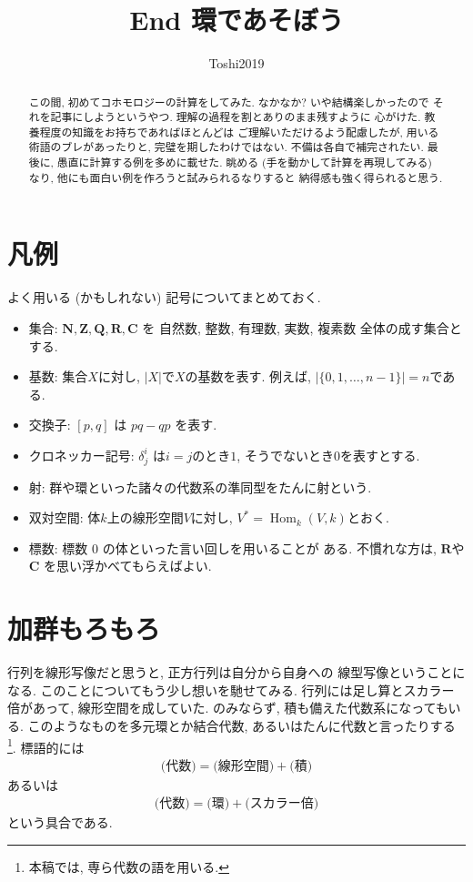 \documentclass[11pt, a4paper, dvipdfmx]{jsarticle}
\title{End 環であそぼう}
\author{Toshi2019}
\date{}
\theoremstyle{definition}
\newcommand{\nn}{\mathbf{N}}
\newcommand{\zz}{\mathbf{Z}}
\newcommand{\qq}{\mathbf{Q}}
\newcommand{\rr}{\mathbf{R}}
\newcommand{\cc}{\mathbf{C}}
\newcommand{\Hom}{\mathop{\mathrm{Hom}}\nolimits}
\newcommand{\dl}{\delta} %
\numberwithin{equation}{section}
\begin{document}
\maketitle

\begin{abstract}
    この間, 初めてコホモロジーの計算をしてみた. 
    なかなか? いや結構楽しかったので
    それを記事にしようというやつ. 
    理解の過程を割とありのまま残すように
    心がけた. 
    教養程度の知識をお持ちであればほとんどは
    ご理解いただけるよう配慮したが, 
    用いる術語のブレがあったりと, 
    完璧を期したわけではない. 
    不備は各自で補完されたい. 
    最後に, 愚直に計算する例を多めに載せた. 
    眺める (手を動かして計算を再現してみる) 
    なり, 他にも面白い例を作ろうと試みられるなりすると
    納得感も強く得られると思う. 
\end{abstract}

\section{凡例}

よく用いる (かもしれない) 記号についてまとめておく. 

\begin{itemize}
    \item 集合: $\nn, \zz, \qq, \rr, \cc$ を
    自然数, 整数, 有理数, 実数, 複素数
    全体の成す集合とする. 
    \item 基数: 集合$X$に対し, $|X|$で$X$の基数を表す. 例えば, 
    $|\{0,1,\ldots,n-1\}| = n$である. 
    \item 交換子: $[p,q]$ は $pq - qp$ を表す. 
    \item クロネッカー記号: 
    $\dl_j^i$ は$i=j$のとき$1$, そうでないとき$0$を表すとする. 
    \item 射: 群や環といった諸々の代数系の準同型をたんに射という. 
    \item 双対空間: 体$k$上の線形空間$V$に対し, 
    $V^* = \Hom_k(V,k)$とおく. 
    \item 標数: 標数 0 の体といった言い回しを用いることが
    ある. 不慣れな方は, $\rr$や$\cc$ を思い浮かべてもらえばよい. 
\end{itemize}

\section{加群もろもろ}

行列を線形写像だと思うと, 
正方行列は自分から自身への
線型写像ということになる. 
このことについてもう少し想いを馳せてみる. 
行列には足し算とスカラー倍があって, 線形空間を成していた. 
のみならず, 積も備えた代数系になってもいる. 
このようなものを多元環とか結合代数, 
あるいはたんに代数と言ったりする
\footnote{
    本稿では, 専ら代数の語を用いる. 
}. 
標語的には
\begin{align*}
    \text{(代数)} = \text{(線形空間)} + \text{(積)} \tag*{(甲)}\label{eq:alg1}
\end{align*}
あるいは
\begin{align}
    \text{(代数)} = \text{(環)} + \text{(スカラー倍)} \tag*{(乙)}\label{eq:alg}
\end{align}
という具合である. 
\end{document}
